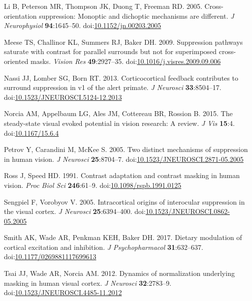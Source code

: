 \documentclass[]{article}
\begin{document}
\leavevmode\hypertarget{ref-Li2005}{}%
Li B, Peterson MR, Thompson JK, Duong T, Freeman RD. 2005. Cross-orientation suppression: Monoptic and dichoptic mechanisms are different. \emph{J Neurophysiol} \textbf{94}:1645--50. doi:\href{https://doi.org/10.1152/jn.00203.2005}{10.1152/jn.00203.2005}

\leavevmode\hypertarget{ref-Meese2009}{}%
Meese TS, Challinor KL, Summers RJ, Baker DH. 2009. Suppression pathways saturate with contrast for parallel surrounds but not for superimposed cross-oriented masks. \emph{Vision Res} \textbf{49}:2927--35. doi:\href{https://doi.org/10.1016/j.visres.2009.09.006}{10.1016/j.visres.2009.09.006}

\leavevmode\hypertarget{ref-Nassi2013}{}%
Nassi JJ, Lomber SG, Born RT. 2013. Corticocortical feedback contributes to surround suppression in v1 of the alert primate. \emph{J Neurosci} \textbf{33}:8504--17. doi:\href{https://doi.org/10.1523/JNEUROSCI.5124-12.2013}{10.1523/JNEUROSCI.5124-12.2013}

\leavevmode\hypertarget{ref-Norcia2015}{}%
Norcia AM, Appelbaum LG, Ales JM, Cottereau BR, Rossion B. 2015. The steady-state visual evoked potential in vision research: A review. \emph{J Vis} \textbf{15}:4. doi:\href{https://doi.org/10.1167/15.6.4}{10.1167/15.6.4}

\leavevmode\hypertarget{ref-Petrov2005}{}%
Petrov Y, Carandini M, McKee S. 2005. Two distinct mechanisms of suppression in human vision. \emph{J Neurosci} \textbf{25}:8704--7. doi:\href{https://doi.org/10.1523/JNEUROSCI.2871-05.2005}{10.1523/JNEUROSCI.2871-05.2005}

\leavevmode\hypertarget{ref-Ross1991}{}%
Ross J, Speed HD. 1991. Contrast adaptation and contrast masking in human vision. \emph{Proc Biol Sci} \textbf{246}:61--9. doi:\href{https://doi.org/10.1098/rspb.1991.0125}{10.1098/rspb.1991.0125}

\leavevmode\hypertarget{ref-Sengpiel2005}{}%
Sengpiel F, Vorobyov V. 2005. Intracortical origins of interocular suppression in the visual cortex. \emph{J Neurosci} \textbf{25}:6394--400. doi:\href{https://doi.org/10.1523/JNEUROSCI.0862-05.2005}{10.1523/JNEUROSCI.0862-05.2005}

\leavevmode\hypertarget{ref-Smith2017}{}%
Smith AK, Wade AR, Penkman KEH, Baker DH. 2017. Dietary modulation of cortical excitation and inhibition. \emph{J Psychopharmacol} \textbf{31}:632--637. doi:\href{https://doi.org/10.1177/0269881117699613}{10.1177/0269881117699613}

\leavevmode\hypertarget{ref-Tsai2012}{}%
Tsai JJ, Wade AR, Norcia AM. 2012. Dynamics of normalization underlying masking in human visual cortex. \emph{J Neurosci} \textbf{32}:2783--9. doi:\href{https://doi.org/10.1523/JNEUROSCI.4485-11.2012}{10.1523/JNEUROSCI.4485-11.2012}
\end{document}
